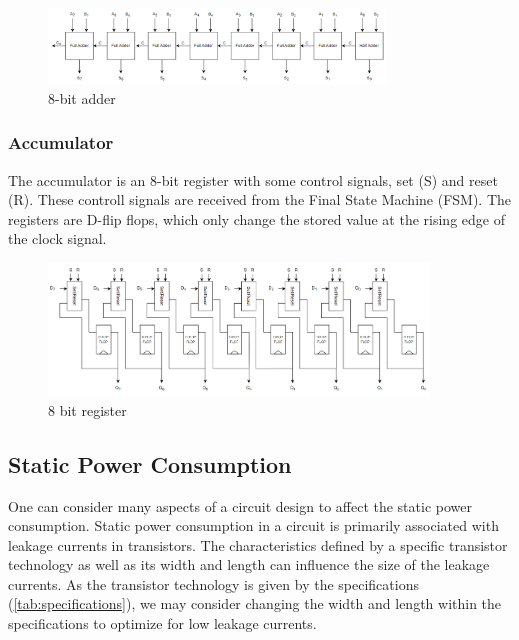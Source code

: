 \begin{figure}[H]
    \centering
    \includegraphics[width=0.8\textwidth]{Figures/8bitadder.png}
    \caption{8-bit adder}
    \label{fig:adder-blokk}
\end{figure}


\subsubsection{Accumulator}
The accumulator is an 8-bit register with some control signals, set (S) and reset (R). These controll signals are received from the Final State Machine (FSM). The registers are D-flip flops, which only change the stored value at the rising edge of the clock signal. 

\begin{figure}[H]
    \centering
    \includegraphics[width=0.9\textwidth]{Figures/8bitRegister.png}
    \caption{8 bit register}
    \label{fig:8bitregister}
\end{figure}



\subsection{Static Power Consumption}
\label{subsec:low_power}

One can consider many aspects of a circuit design to affect the static power consumption. Static power consumption in a circuit is primarily associated with leakage currents in transistors. The characteristics defined by a specific transistor technology as well as its width and length can influence the size of the leakage currents. As the transistor technology is given by the specifications (\ref{tab:specifications}), we may consider changing the width and length within the specifications to optimize for low leakage currents. 

